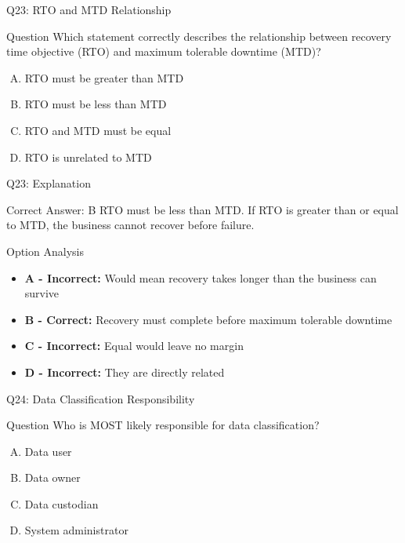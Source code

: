 \documentclass{beamer}
\begin{document}
	\begin{frame}{Q23: RTO and MTD Relationship}
		\begin{block}{Question}
			Which statement correctly describes the relationship between recovery time objective (RTO) and maximum tolerable downtime (MTD)?
		\end{block}
		\begin{enumerate}[(A)]
			\item RTO must be greater than MTD
			\item RTO must be less than MTD
			\item RTO and MTD must be equal
			\item RTO is unrelated to MTD
		\end{enumerate}
	\end{frame}
	
	\begin{frame}{Q23: Explanation}
		\begin{block}{Correct Answer: B}
			RTO must be less than MTD. If RTO is greater than or equal to MTD, the business cannot recover before failure.
		\end{block}
		\begin{block}{Option Analysis}
			\begin{itemize}
				\item \textbf{A - Incorrect:} Would mean recovery takes longer than the business can survive
				\item \textbf{B - Correct:} Recovery must complete before maximum tolerable downtime
				\item \textbf{C - Incorrect:} Equal would leave no margin
				\item \textbf{D - Incorrect:} They are directly related
			\end{itemize}
		\end{block}
	\end{frame}
	
	\begin{frame}{Q24: Data Classification Responsibility}
		\begin{block}{Question}
			Who is MOST likely responsible for data classification?
		\end{block}
		\begin{enumerate}[(A)]
			\item Data user
			\item Data owner
			\item Data custodian
			\item System administrator
		\end{enumerate}
	\end{frame}
	
\end{document}
